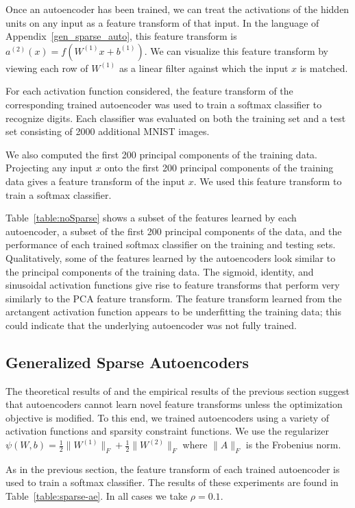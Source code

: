 \documentclass[twocolumn]{article}
\newcommand{\Wo}{W^{(1)}}
\newcommand{\Wt}{W^{(2)}}
\newcommand{\bo}{b^{(1)}}
\newcommand{\at}{a^{(2)}}
\begin{document}
Once an autoencoder has been trained, we can treat the activations of the hidden
units on any input as a feature transform of that input. In the language of
Appendix~\ref{gen_sparse_auto}, this feature transform is $\at(x)=f(\Wo x+\bo)$.
We can visualize this feature transform by viewing each row of $\Wo$ as a linear
filter against which the input $x$ is matched.

For each activation function considered, the feature transform of the corresponding
trained autoencoder was used to train a softmax classifier
to recognize digits. Each classifier was evaluated on both the training set and
a test set consisting of 2000 additional MNIST images.

We also computed the first 200 principal components of the training data.
Projecting any input $x$ onto the first 200 principal components of the
training data gives a feature transform of the input $x$. We used this feature
transform to train a softmax classifier.

Table~\ref{table:noSparse} shows a subset of the features learned by each
autoencoder, a subset of the first 200 principal components of the data, and
the performance of each trained softmax classifier on the training and testing
sets. Qualitatively, some of the features learned by the autoencoders look
similar to the principal components of the training data. The sigmoid, identity,
and sinusoidal activation functions give rise to feature transforms that perform
very similarly to the PCA feature transform. The feature transform learned from
the arctangent activation function appears to be underfitting the training data;
this could indicate that the underlying autoencoder was not fully trained.

\subsection{Generalized Sparse Autoencoders}
The theoretical results of \cite{bourlard1988auto} and the empirical results of
the previous section suggest that autoencoders cannot learn novel feature
transforms unless the optimization objective is modified. To this end, we
trained autoencoders using a variety of activation functions and sparsity
constraint functions. We use the regularizer
$\psi(W,b)=\frac12\|\Wo\|_F+\frac12\|\Wt\|_F$
where $\|A\|_F$ is the Frobenius norm.

As in the previous section, the feature transform of each trained autoencoder
is used to train a softmax classifier. The results of these experiments are
found in Table~\ref{table:sparse-ae}. In all cases we take $\rho=0.1$.
\end{document}
